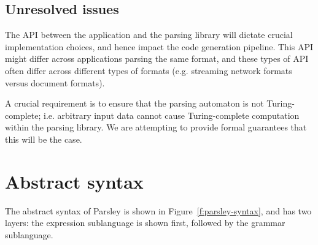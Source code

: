 \documentclass[letterpaper]{article}
\begin{document}
\subsection*{Unresolved issues}

The API between the application and the parsing library will dictate
crucial implementation choices, and hence impact the code generation
pipeline.  This API might differ across applications parsing the same
format, and these types of API often differ across different types of
formats (e.g. streaming network formats versus document formats).

A crucial requirement is to ensure that the parsing automaton is not
Turing-complete; i.e. arbitrary input data cannot cause
Turing-complete computation within the parsing library.  We are
attempting to provide formal guarantees that this will be the case.

\section{Abstract syntax}
\label{s:syntax}

The abstract syntax of Parsley is shown in
Figure~\ref{f:parsley-syntax}, and has two layers: the expression
sublanguage is shown first, followed by the grammar sublanguage.
\end{document}
